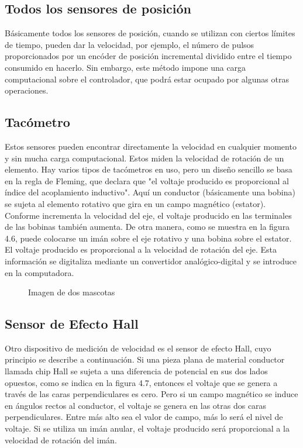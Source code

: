 \subsection*{\quad\textbf{Todos los sensores de posición}}
Básicamente todos los sensores de posición, cuando se utilizan con ciertos límites de tiempo, pueden dar la velocidad, por ejemplo, el número de pulsos proporcionados por un encóder de posición incremental dividido entre el tiempo consumido en hacerlo. Sin embargo, este método impone una carga computacional sobre el controlador, que podrá estar ocupado por algunas otras operaciones.


\subsection*{\quad\textbf{Tacómetro}}
Estos sensores pueden encontrar directamente la velocidad en cualquier momento y sin mucha carga computacional. Estos miden la velocidad de rotación de un elemento. Hay varios tipos de tacómetros en uso, pero un diseño sencillo se basa en la regla de Fleming, que declara que "el voltaje producido es proporcional al índice del acoplamiento inductivo". Aquí un conductor (básicamente una bobina) se sujeta al elemento rotativo que gira en un campo magnético (estator). Conforme incrementa la velocidad del eje, el voltaje producido en las terminales de las bobinas también aumenta. De otra manera, como se muestra en la figura 4.6, puede colocarse un imán sobre el eje rotativo y una bobina sobre el estator. El voltaje producido es proporcional a la velocidad de rotación del eje. Esta información se digitaliza mediante un convertidor analógico-digital y se introduce en la computadora.

\begin{figure}[h]
	\centering
	\qquad
	\caption{Imagen de dos mascotas}
	\label{fig:Tacómetro}
\end{figure}

\subsection*{\quad\textbf{Sensor de Efecto Hall}}
Otro dispositivo de medición de velocidad es el sensor de efecto Hall, cuyo principio se describe a continuación. Si una pieza plana de material conductor llamada chip Hall se sujeta a una diferencia de potencial en sus dos lados opuestos, como se indica en la figura 4.7, entonces el voltaje que se genera a través de las caras perpendiculares es cero. Pero si un campo magnético se induce en ángulos rectos al conductor, el voltaje se genera en las otras dos caras perpendiculares. Entre más alto sea el valor de campo, más lo será el nivel de voltaje. Si se utiliza un imán anular, el voltaje producido será proporcional a la velocidad de rotación del imán.


